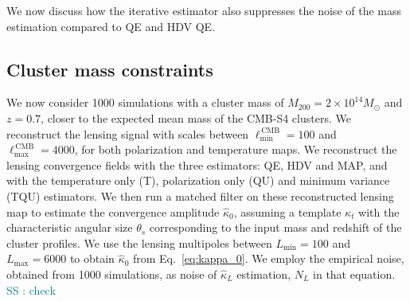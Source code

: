 \documentclass[prd, superscriptaddress, tightenlines, longbibliography, nofootinbib, eqsecnum, amsfonts, amsmath, floatfix, twocolumn, notitlepage]{revtex4-2}
\newcommand{\bb}[1]{\textcolor{teal}{SS : #1}}
\begin{document}
We now discuss how the iterative estimator also suppresses the noise of the mass estimation compared to QE and HDV QE.


\subsection{Cluster mass constraints}


We now consider 1000 simulations with a cluster mass of $M_{200} = 2 \times 10^{14} M_{\odot}$ and $z=0.7$, closer to the expected mean mass of the CMB-S4 clusters. We reconstruct the lensing signal with scales between  $\ell_{\text{min}}^{\, \text{CMB}}=100$ and $\ell_{\text{max}}^{\, \text{CMB}} = 4000$, for both polarization and temperature maps.
We reconstruct the lensing convergence fields with the three estimators: QE, HDV and MAP, and with the temperature only (T), polarization only (QU) and minimum variance (TQU) estimators. We then run a matched filter on these reconstructed lensing map to estimate the convergence amplitude $\hat \kappa_0$, assuming a template $\kappa_t$ with the characteristic angular size $\theta_s$ corresponding to the input mass and redshift of the cluster profiles.
We use the lensing multipoles between $L_{\text{min}}=100$ and $L_{\text{max}}=6000$ to obtain $\hat \kappa_0$ from Eq.~\ref{eq:kappa_0}. We employ the empirical noise, obtained from 1000 simulations, as noise of $\hat \kappa_{L}$ estimation, $N_L$ in that equation. \bb{check}
\end{document}

